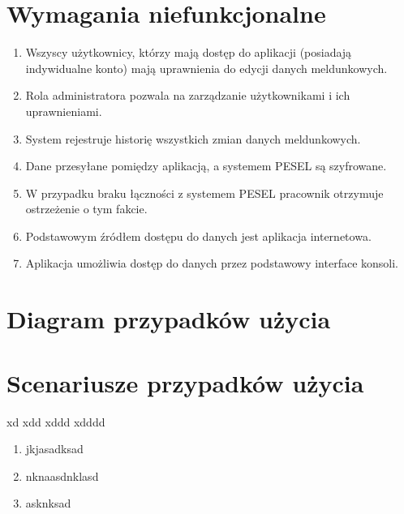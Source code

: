 \documentclass[12pt]{article}
\begin{document}
\section{Wymagania niefunkcjonalne}
\begin{enumerate}
    \item Wszyscy użytkownicy, którzy mają dostęp do aplikacji (posiadają indywidualne konto) mają uprawnienia do edycji danych meldunkowych.
    \item Rola administratora pozwala na zarządzanie użytkownikami i ich uprawnieniami.
    \item System rejestruje historię wszystkich zmian danych meldunkowych.
    \item Dane przesyłane pomiędzy aplikacją, a systemem PESEL są szyfrowane.
    \item W przypadku braku łączności z systemem PESEL pracownik otrzymuje ostrzeżenie o tym fakcie.
    \item Podstawowym źródłem dostępu do danych jest aplikacja internetowa.
    \item Aplikacja umożliwia dostęp do danych przez podstawowy interface konsoli.
\end{enumerate}
\newpage
\section{Diagram przypadków użycia}

\section{Scenariusze przypadków użycia}

\scenario
    {xd}
    {xdd}
    {xddd}
    {xdddd}
    {
        \begin{enumerate}
            \setlength\itemsep{0.1em}
            \item jkjasadksad
            \item nknaasdnklasd
            \item asknksad
        \end{enumerate}
    }
\end{document}
